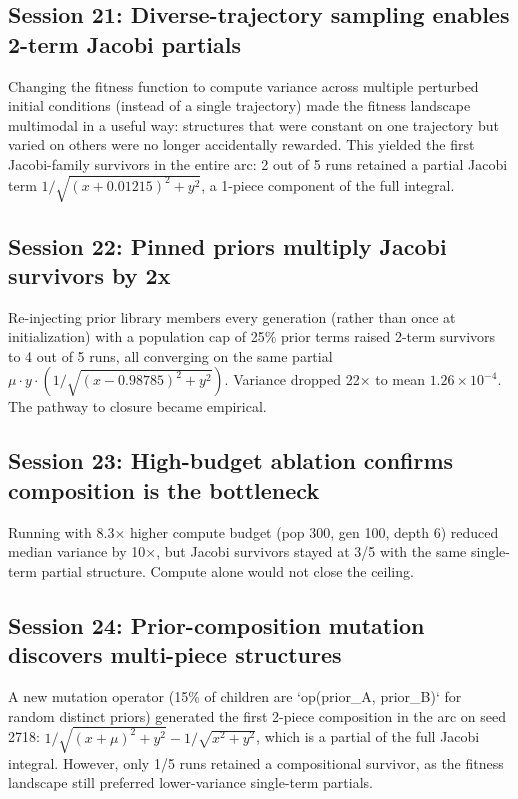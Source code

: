 \subsection{Session 21: Diverse-trajectory sampling enables 2-term Jacobi partials}

Changing the fitness function to compute variance across multiple perturbed initial conditions (instead of a single trajectory) made the fitness landscape multimodal in a useful way: structures that were constant on one trajectory but varied on others were no longer accidentally rewarded. This yielded the first Jacobi-family survivors in the entire arc: 2 out of 5 runs retained a partial Jacobi term $1/\sqrt{(x+0.01215)^2 + y^2}$, a 1-piece component of the full integral.

\subsection{Session 22: Pinned priors multiply Jacobi survivors by 2x}

Re-injecting prior library members every generation (rather than once at initialization) with a population cap of 25\% prior terms raised 2-term survivors to 4 out of 5 runs, all converging on the same partial $\mu \cdot y \cdot (1/\sqrt{(x-0.98785)^2+y^2})$. Variance dropped 22× to mean $1.26 \times 10^{-4}$. The pathway to closure became empirical.

\subsection{Session 23: High-budget ablation confirms composition is the bottleneck}

Running with 8.3× higher compute budget (pop 300, gen 100, depth 6) reduced median variance by 10×, but Jacobi survivors stayed at 3/5 with the same single-term partial structure. Compute alone would not close the ceiling.

\subsection{Session 24: Prior-composition mutation discovers multi-piece structures}

A new mutation operator (15\% of children are `op(prior_A, prior_B)` for random distinct priors) generated the first 2-piece composition in the arc on seed 2718: $1/\sqrt{(x+\mu)^2+y^2} - 1/\sqrt{x^2+y^2}$, which is a partial of the full Jacobi integral. However, only 1/5 runs retained a compositional survivor, as the fitness landscape still preferred lower-variance single-term partials.

